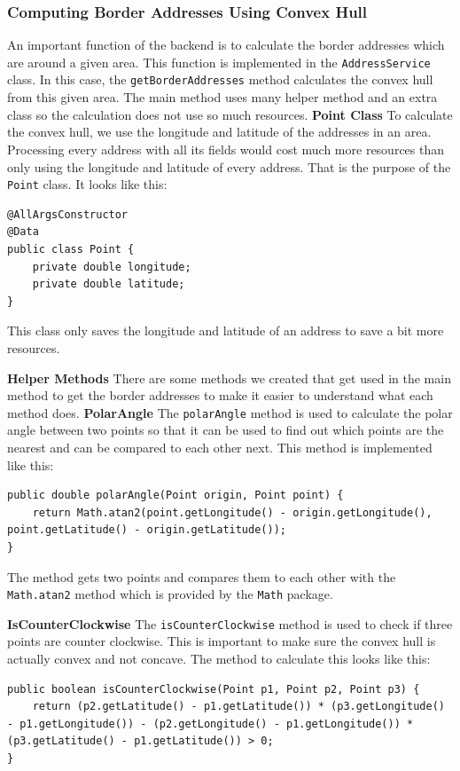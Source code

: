     \subsubsection{Computing Border Addresses Using Convex Hull}
    An important function of the backend is to calculate the border addresses which are around a given area. This function is implemented in the \texttt{AddressService} class. In this case, the \texttt{getBorderAddresses} method calculates the convex hull from this given area. The main method uses many helper method and an extra class so the calculation does not use so much resources. \newline
    \textbf{Point Class} \newline
    To calculate the convex hull, we use the longitude and latitude of the addresses in an area. Processing every address with all its fields would cost much more resources than only using the longitude and latitude of every address. That is the purpose of the \texttt{Point} class. It looks like this: 
    \lstset{style=mycsharp, caption=Point Class}
    \begin{lstlisting}
@AllArgsConstructor
@Data
public class Point {
    private double longitude;
    private double latitude;
}
    \end{lstlisting}
    This class only saves the longitude and latitude of an address to save a bit more resources. \newline

    \textbf{Helper Methods} \newline
    There are some methods we created that get used in the main method to get the border addresses to make it easier to understand what each method does. 
    \textbf{PolarAngle}
    The \texttt{polarAngle} method is used to calculate the polar angle between two points so that it can be used to find out which points are the nearest and can be compared to each other next. This method is implemented like this: 
    \lstset{style=mycsharp, caption=Polar Angle Method}
    \begin{lstlisting}
public double polarAngle(Point origin, Point point) {
    return Math.atan2(point.getLongitude() - origin.getLongitude(), point.getLatitude() - origin.getLatitude());
}
    \end{lstlisting}
    The method gets two points and compares them to each other with the \texttt{Math.atan2} method which is provided by the \texttt{Math} package. \newline

    \textbf{IsCounterClockwise} \newline
    The \texttt{isCounterClockwise} method is used to check if three points are counter clockwise. This is important to make sure the convex hull is actually convex and not concave. The method to calculate this looks like this: 
    \lstset{style=mycsharp, caption=is Counter Clockwise Method}
    \begin{lstlisting}
public boolean isCounterClockwise(Point p1, Point p2, Point p3) {
    return (p2.getLatitude() - p1.getLatitude()) * (p3.getLongitude() - p1.getLongitude()) - (p2.getLongitude() - p1.getLongitude()) * (p3.getLatitude() - p1.getLatitude()) > 0;
}
    \end{lstlisting}


